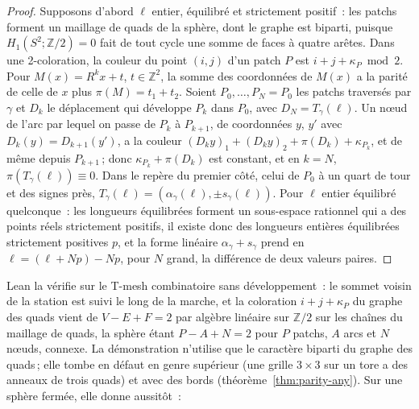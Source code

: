 \documentclass[11pt,a4paper]{article}
\newcommand{\Z}{\mathbb{Z}}
\newcommand{\shift}{s}
\begin{document}
\begin{proof}
Supposons d'abord $\ell$ entier, équilibré et strictement positif~: les
patchs forment un maillage de quads de la sphère, dont le graphe est biparti,
puisque $H_1(S^2; \Z/2) = 0$ fait de tout cycle une somme de faces à quatre
arêtes. Dans une 2-coloration, la couleur du point $(i, j)$ d'un patch $P$ est
$i + j + \kappa_P \bmod 2$. Pour $M(x) = R^k x + t$, $t \in \Z^2$, la somme
des coordonnées de $M(x)$ a la parité de celle de $x$ plus $\pi(M) = t_1 +
t_2$. Soient $P_0, \dots, P_N = P_0$ les patchs traversés par $\gamma$ et
$D_k$ le déplacement qui développe $P_k$ dans $P_0$, avec $D_N =
T_\gamma(\ell)$. Un nœud de l'arc par lequel on passe de $P_k$ à $P_{k+1}$, de
coordonnées $y$, $y'$ avec $D_k(y) = D_{k+1}(y')$, a la couleur $(D_k y)_1 +
(D_k y)_2 + \pi(D_k) + \kappa_{P_k}$, et de même depuis $P_{k+1}$\,; donc
$\kappa_{P_k} + \pi(D_k)$ est constant, et en $k = N$, $\pi(T_\gamma(\ell))
\equiv 0$. Dans le repère du premier côté, celui de $P_0$ à un quart de tour
et des signes près, $T_\gamma(\ell) = (\alpha_\gamma(\ell),
\pm\shift_\gamma(\ell))$. Pour $\ell$ entier équilibré quelconque~: les
longueurs équilibrées forment un sous-espace rationnel qui a des points réels
strictement positifs, il existe donc des longueurs entières équilibrées
strictement positives $p$, et la forme linéaire $\alpha_\gamma +
\shift_\gamma$ prend en $\ell = (\ell + Np) - Np$, pour $N$ grand, la
différence de deux valeurs paires.
\end{proof}

Lean la vérifie sur le T-mesh combinatoire sans développement~: le sommet
voisin de la station est suivi le long de la marche, et la coloration $i + j +
\kappa_P$ du graphe des quads vient de $V - E + F = 2$ par algèbre linéaire
sur $\Z/2$ sur les chaînes du maillage de quads, la sphère étant $P - A + N =
2$ pour $P$ patchs, $A$ arcs et $N$ nœuds, connexe. La démonstration
n'utilise que le caractère biparti du graphe des quads\,;
elle tombe en défaut en genre supérieur (une grille $3 \times 3$ sur un tore a
des anneaux de trois quads) et avec des bords
(théorème~\ref{thm:parity-any}). Sur une sphère fermée, elle donne aussitôt~:
\end{document}
